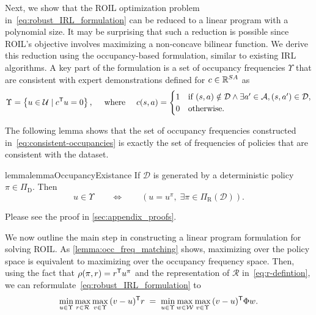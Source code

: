 Next, we show that the ROIL optimization problem in~\eqref{eq:robust_IRL_formulation} can be reduced to a linear program with a polynomial size. It may be surprising that such a reduction is possible since ROIL's objective involves maximizing a non-concave bilinear function. We derive this reduction using the occupancy-based formulation, similar to existing IRL algorithms. A key part of the formulation is a set of occupancy frequencies $\Upsilon$ that are consistent with expert demonstrations defined for $c\in \mathbb{R}^{SA}$ as 
%
\begin{equation}\label{eq:consistent-occupancies}
  \Upsilon = \left\{ u \in \mathcal{U} \mid c^{\mathsf{T}} u = 0  \right\},
  \quad
  \text{ where }
  \quad
  c(s,a) =
  \begin{cases}
    1 &\text{if  }
        (s,a) \notin \mathcal{D} \wedge
        \exists a'\in \mathcal{A}, (s, a') \in \mathcal{D}, \\
    0 & \text{otherwise}.
  \end{cases}
\end{equation}




The following lemma shows that the set of occupancy frequencies constructed in~\eqref{eq:consistent-occupancies} is exactly the set of frequencies of policies that are consistent with the dataset. 
\begin{restatable}{lemma}{lemmaOccupancyExistance}
\label{lemma:occ_freq_matching}
If $\mathcal{D}$ is generated by a deterministic policy $\pi \in \Pi_{\mathrm{D}}$. Then
\[
  u \in \Upsilon
  \qquad \Leftrightarrow \qquad
  \left(u = u^{\pi},\;  \exists \pi \in \Pi_{\mathrm{R}}(\mathcal{D})\right).
\]
\end{restatable}
Please see the proof in \cref{sec:appendix_proofs}.

We now outline the main step in constructing a linear program formulation for solving ROIL. As \cref{lemma:occ_freq_matching} shows,  maximizing over the policy space is equivalent to maximizing over the occupancy frequency space. Then, using the fact that $\rho(\pi,r) = r^{\mathsf{T}} u^{\pi}$ and the representation of $\mathcal{R}$ in~\eqref{eq:r-defintion}, we can reformulate~\eqref{eq:robust_IRL_formulation} to
%
\begin{equation} \label{eq:roil-occupancy}
    \min_{u \in \Upsilon} \max_{r \in \mathcal{R}} \max_{v \in \Upsilon} \, (v- u )^{\mathsf{T}}  r
    \; =\; 
    \min_{u \in \Upsilon} \max_{w \in \mathcal{W}} \max_{v \in \Upsilon} \, (v - u)^{\mathsf{T}} \Phi w.
\end{equation}
%

